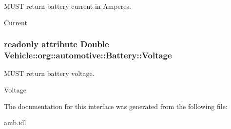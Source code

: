 M\-U\-S\-T return battery current in Amperes. 

Current \hypertarget{interfaceVehicle_1_1org_1_1automotive_1_1Battery_a360c66a17c91cce2b32d7cd0819635f9}{
\subsubsection[{Voltage}]{\setlength{\rightskip}{0pt plus 5cm}readonly attribute Double Vehicle\-::org\-::automotive\-::\-Battery\-::\-Voltage}}\label{interfaceVehicle_1_1org_1_1automotive_1_1Battery_a360c66a17c91cce2b32d7cd0819635f9}


M\-U\-S\-T return battery voltage. 

Voltage 

The documentation for this interface was generated from the following file\-:\begin{DoxyCompactItemize}
\item 
amb.\-idl\end{DoxyCompactItemize}
